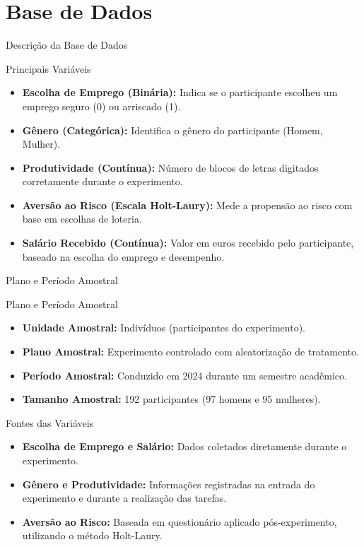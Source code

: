 \documentclass[aspectratio=169, xcolor={dvipsnames}, 10pt, brazil]{beamer}
\begin{document}
\section{Base de Dados}
\begin{frame}{Descrição da Base de Dados}
    \begin{block}{Principais Variáveis}
        \begin{itemize}
            \item \textbf{Escolha de Emprego (Binária):} Indica se o participante escolheu um emprego seguro (0) ou arriscado (1).
            \item \textbf{Gênero (Categórica):} Identifica o gênero do participante (Homem, Mulher).
            \item \textbf{Produtividade (Contínua):} Número de blocos de letras digitados corretamente durante o experimento.
            \item \textbf{Aversão ao Risco (Escala Holt-Laury):} Mede a propensão ao risco com base em escolhas de loteria.
            \item \textbf{Salário Recebido (Contínua):} Valor em euros recebido pelo participante, baseado na escolha do emprego e desempenho.
        \end{itemize}
    \end{block}
\end{frame}

\begin{frame}{Plano e Período Amostral}
    \begin{block}{Plano e Período Amostral}
        \begin{itemize}
            \item \textbf{Unidade Amostral:} Indivíduos (participantes do experimento).
            \item \textbf{Plano Amostral:} Experimento controlado com aleatorização de tratamento.
            \item \textbf{Período Amostral:} Conduzido em 2024 durante um semestre acadêmico.
            \item \textbf{Tamanho Amostral:} 192 participantes (97 homens e 95 mulheres).
        \end{itemize}
    \end{block}
    
    \begin{block}{Fontes das Variáveis}
        \begin{itemize}
            \item \textbf{Escolha de Emprego e Salário:} Dados coletados diretamente durante o experimento.
            \item \textbf{Gênero e Produtividade:} Informações registradas na entrada do experimento e durante a realização das tarefas.
            \item \textbf{Aversão ao Risco:} Baseada em questionário aplicado pós-experimento, utilizando o método Holt-Laury.
        \end{itemize}
    \end{block}
\end{frame}
\end{document}
